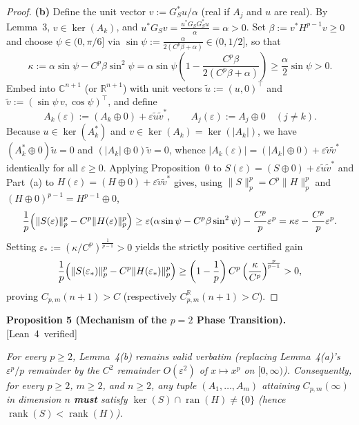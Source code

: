 \documentclass[10pt,letterpaper]{article}
\newcommand{\leanbadge}[1]{\mbox{\sffamily\scriptsize\color{leanborder}[#1]}}
\newcommand{\C}{\mathbb{C}}
\newcommand{\R}{\mathbb{R}}
\newcommand{\ran}{\operatorname{ran}}
\newcommand{\rank}{\operatorname{rank}}
\begin{document}
\begin{proof}
\textbf{(b)} Define the unit vector $v := G_S^* u / \alpha$ (real if $A_j$ and $u$ are real). By Lemma~3, $v \in \ker(A_k)$, and $u^* G_S v = \frac{u^* G_S G_S^* u}{\alpha} = \alpha > 0$. Set $\beta := v^* H^{p-1} v \ge 0$ and choose $\psi \in (0,\pi/6]$ via $\sin\psi := \frac{\alpha}{2(C^p\beta + \alpha)} \in (0, 1/2]$, so that
\[
  \kappa := \alpha\sin\psi - C^p\beta\sin^2\psi = \alpha\sin\psi\left(1 - \frac{C^p\beta}{2(C^p\beta + \alpha)}\right) \ge \frac{\alpha}{2}\sin\psi > 0.
\]
Embed into $\C^{n+1}$ (or $\R^{n+1}$) with unit vectors $\tilde{u} := (u, 0)^\top$ and $\tilde{v} := (\sin\psi\,v, \cos\psi)^\top$, and define
\[
  A_k(\varepsilon) := (A_k \oplus 0) + \varepsilon\tilde{u}\tilde{v}^*, \qquad A_j(\varepsilon) := A_j \oplus 0 \quad (j \neq k).
\]
Because $u \in \ker(A_k^*)$ and $v \in \ker(A_k) = \ker(|A_k|)$, we have $(A_k^* \oplus 0)\tilde{u} = 0$ and $(|A_k| \oplus 0)\tilde{v} = 0$, whence $|A_k(\varepsilon)| = (|A_k| \oplus 0) + \varepsilon\tilde{v}\tilde{v}^*$ identically for all $\varepsilon \ge 0$. Applying Proposition~0 to $S(\varepsilon) = (S \oplus 0) + \varepsilon\tilde{u}\tilde{v}^*$ and Part~(a) to $H(\varepsilon) = (H \oplus 0) + \varepsilon\tilde{v}\tilde{v}^*$ gives, using $\|S\|_p^p = C^p\|H\|_p^p$ and $(H \oplus 0)^{p-1} = H^{p-1} \oplus 0$,
\[
  \frac{1}{p}\Bigl(\|S(\varepsilon)\|_p^p - C^p \|H(\varepsilon)\|_p^p\Bigr) \ge \varepsilon(\alpha\sin\psi - C^p\beta\sin^2\psi) - \frac{C^p}{p}\varepsilon^p = \kappa\varepsilon - \frac{C^p}{p}\varepsilon^p.
\]
Setting $\varepsilon_* := (\kappa / C^p)^{\frac{1}{p-1}} > 0$ yields the strictly positive certified gain
\[
  \frac{1}{p}\Bigl(\|S(\varepsilon_*)\|_p^p - C^p \|H(\varepsilon_*)\|_p^p\Bigr) \ge \left(1 - \frac{1}{p}\right) C^p \left(\frac{\kappa}{C^p}\right)^{\!\frac{p}{p-1}} > 0,
\]
proving $C_{p,m}(n+1) > C$ (respectively $C_{p,m}^{\R}(n+1) > C$).
\end{proof}

\begin{tcolorbox}[lemmabox]
\textbf{Proposition 5 (Mechanism of the $p = 2$ Phase Transition).}\hfill\leanbadge{Lean~4 verified}\par\vspace{1.5pt}
\emph{For every $p \ge 2$, Lemma~4(b) remains valid verbatim (replacing Lemma~4(a)'s $\varepsilon^p/p$ remainder by the $C^2$ remainder $O(\varepsilon^2)$ of $x \mapsto x^p$ on $[0,\infty)$). Consequently, for every $p \ge 2$, $m \ge 2$, and $n \ge 2$, any tuple $(A_1,\dots,A_m)$ attaining $C_{p,m}(\infty)$ in dimension $n$ \textbf{must} satisfy $\ker(S) \cap \ran(H) \neq \{0\}$ (hence $\rank(S) < \rank(H)$).}
\end{tcolorbox}
\end{document}

